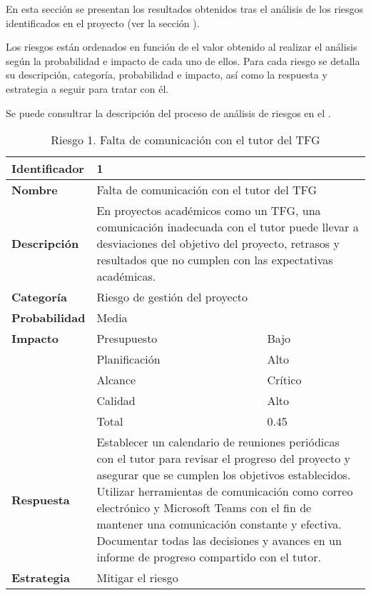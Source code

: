 En esta sección se presentan los resultados obtenidos tras el análisis de los riesgos identificados en el proyecto (ver la sección ).

Los riesgos están ordenados en función de el valor obtenido al realizar el análisis según la probabilidad e impacto de cada uno de ellos.
Para cada riesgo se detalla su descripción, categoría, probabilidad e impacto, así como la respuesta y estrategia a seguir para tratar con él.

Se puede consultrar la descripción del proceso de análisis de riesgos en el .
\begin{table}[H]
    \centering
    \caption{Riesgo 1. Falta de comunicación con el tutor del TFG}
    \label{table:risk_comunicacion-tutor}
    \begin{tabular}{>{\columncolor{rowcolor}}l l l}
    \toprule
    \rowcolor{lightgreen}
    \textbf{Identificador} & \multicolumn{2}{l}{1} \\
    \midrule
    \textbf{Nombre} & \multicolumn{2}{l}{Falta de comunicación con el tutor del TFG} \\
    \midrule
    \textbf{Descripción} & \multicolumn{2}{p{10cm}}{En proyectos académicos como un TFG, una comunicación inadecuada con el tutor puede llevar a desviaciones del objetivo del proyecto, retrasos y resultados que no cumplen con las expectativas académicas.} \\
    \midrule
    \textbf{Categoría} & \multicolumn{2}{l}{Riesgo de gestión del proyecto} \\
    \midrule
    \textbf{Probabilidad} & \multicolumn{2}{l}{Media} \\
    \midrule
    \textbf{Impacto} & Presupuesto & Bajo \\
    \cmidrule(lr){2-3}
    & Planificación & Alto \\
    \cmidrule(lr){2-3}
    & Alcance & Crítico \\
    \cmidrule(lr){2-3}
    & Calidad & Alto \\
    \cmidrule(lr){2-3}
    & Total & 0.45 \\
    \midrule
    \textbf{Respuesta} & \multicolumn{2}{p{10cm}}{Establecer un calendario de reuniones periódicas con el tutor para revisar el progreso del proyecto y asegurar que se cumplen los objetivos establecidos. Utilizar herramientas de comunicación como correo electrónico y Microsoft Teams con el fin de mantener una comunicación constante y efectiva. Documentar todas las decisiones y avances en un informe de progreso compartido con el tutor.} \\
    \midrule
    \textbf{Estrategia} & \multicolumn{2}{l}{Mitigar el riesgo} \\
    \bottomrule
    \end{tabular}
\end{table}

